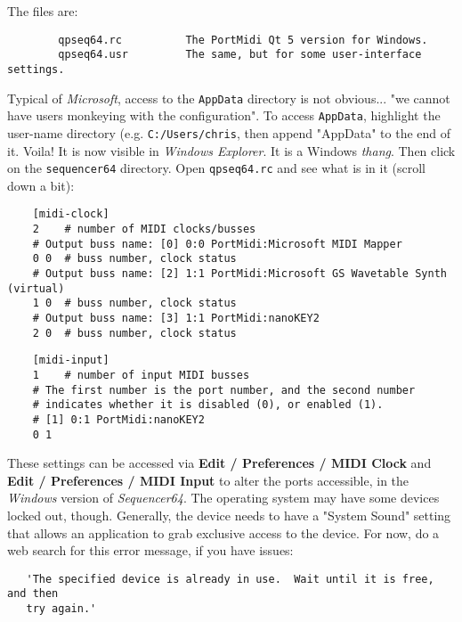     The files are:

\begin{verbatim}
        qpseq64.rc          The PortMidi Qt 5 version for Windows.
        qpseq64.usr         The same, but for some user-interface settings.
\end{verbatim}

    Typical of \textsl{Microsoft}, access to the \texttt{AppData} directory
    is not obvious... "we cannot have users monkeying with the configuration".
    To access \texttt{AppData}, highlight the user-name directory
    (e.g. \texttt{C:/Users/chris}, then append
    "AppData" to the end of it.  Voila! It is now visible in
    \textsl{Windows Explorer}.
    It is a Windows \textsl{thang}.
    Then click on the \texttt{sequencer64} directory.
    Open \texttt{qpseq64.rc} and see what is in it (scroll down a bit):

\begin{verbatim}
    [midi-clock]
    2    # number of MIDI clocks/busses
    # Output buss name: [0] 0:0 PortMidi:Microsoft MIDI Mapper
    0 0  # buss number, clock status
    # Output buss name: [2] 1:1 PortMidi:Microsoft GS Wavetable Synth (virtual)
    1 0  # buss number, clock status
    # Output buss name: [3] 1:1 PortMidi:nanoKEY2
    2 0  # buss number, clock status
\end{verbatim}
    
\begin{verbatim}
    [midi-input]
    1    # number of input MIDI busses
    # The first number is the port number, and the second number
    # indicates whether it is disabled (0), or enabled (1).
    # [1] 0:1 PortMidi:nanoKEY2
    0 1
\end{verbatim}

   These settings can be accessed via
   \textbf{Edit / Preferences / MIDI Clock} and
   \textbf{Edit / Preferences / MIDI Input} to
	alter the ports accessible, in the \textsl{Windows}
   version of \textsl{Sequencer64}.
   The operating system may have some devices locked out, though.
   Generally, the device needs to have a "System Sound" setting that allows an
   application to grab exclusive access to the device.
   For now, do a web search for this error message, if you have issues:

\begin{verbatim}
   'The specified device is already in use.  Wait until it is free, and then
   try again.'
\end{verbatim}

